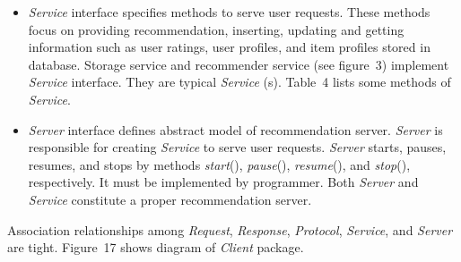 \documentclass[a4paper]{llncs}
\begin{document}
\begin{itemize}
\item \textit{Service} interface specifies methods to serve user requests. These methods focus on providing recommendation, inserting, updating and getting information such as user ratings, user profiles, and item profiles stored in database. Storage service and recommender service (see figure~3) implement \textit{Service} interface. They are typical \textit{Service} (s). Table~4 lists some methods of \textit{Service}.
\item \textit{Server} interface defines abstract model of recommendation server. \textit{Server} is responsible for creating \textit{Service} to serve user requests. \textit{Server} starts, pauses, resumes, and stops by methods \textit{start}(), \textit{pause}(), \textit{resume}(), and \textit{stop}(), respectively. It must be implemented by programmer. Both \textit{Server} and \textit{Service} constitute a proper recommendation server.
\end{itemize}
Association relationships among \textit{Request}, \textit{Response}, \textit{Protocol}, \textit{Service}, and \textit{Server} are tight. Figure~17 shows diagram of \textit{Client} package.
\end{document}
